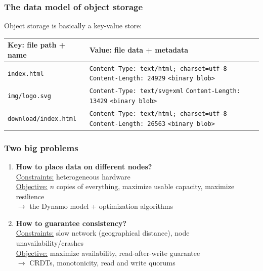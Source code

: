 \documentclass[aspectratio=169]{beamer}
\begin{document}
\begin{frame}
	\frametitle{The data model of object storage}
	Object storage is basically a key-value store:
	\vspace{1em}

		\begin{center}
		\begin{tabular}{|l|p{8cm}|}
			\hline
			\textbf{Key: file path + name} & \textbf{Value: file data + metadata} \\
			\hline
			\hline
			\texttt{index.html} &
				\texttt{Content-Type: text/html; charset=utf-8} \newline
				\texttt{Content-Length: 24929} \newline
				\texttt{<binary blob>} \\ 
			\hline
			\texttt{img/logo.svg} &
				\texttt{Content-Type: text/svg+xml} \newline
				\texttt{Content-Length: 13429} \newline
				\texttt{<binary blob>} \\ 
			\hline
			\texttt{download/index.html} &
				\texttt{Content-Type: text/html; charset=utf-8} \newline
				\texttt{Content-Length: 26563} \newline
				\texttt{<binary blob>} \\ 
			\hline
		\end{tabular}
		\end{center}

\end{frame}

\begin{frame}
	\frametitle{Two big problems}
	\begin{enumerate}
		\item \textbf{How to place data on different nodes?}\\
			\vspace{1em}
			\underline{Constraints:} heterogeneous hardware\\
			\underline{Objective:} $n$ copies of everything, maximize usable capacity, maximize resilience\\
			\vspace{1em}
			$\to$ the Dynamo model + optimization algorithms
			\vspace{2em}
		\item<2-> \textbf{How to guarantee consistency?}\\
			\vspace{1em}
			\underline{Constraints:} slow network (geographical distance), node unavailability/crashes\\
			\underline{Objective:} maximize availability, read-after-write guarantee\\
			\vspace{1em}
			$\to$ CRDTs, monotonicity, read and write quorums
	\end{enumerate}
\end{frame}
\end{document}
